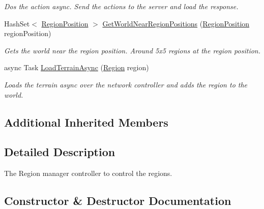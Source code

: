 \begin{DoxyCompactItemize}
\begin{DoxyCompactList}\small\item\em Dos the action async. Send the actions to the server and load the response. \end{DoxyCompactList}\item 
Hash\+Set$<$ \hyperlink{classCore_1_1Models_1_1RegionPosition}{Region\+Position} $>$ \hyperlink{classClient_1_1Common_1_1Manager_1_1RegionManagerController_a200816e068a646522d5ecb069c637698}{Get\+World\+Near\+Region\+Positions} (\hyperlink{classCore_1_1Models_1_1RegionPosition}{Region\+Position} region\+Position)
\begin{DoxyCompactList}\small\item\em Gets the world near the region position. Around 5x5 regions at the region position. \end{DoxyCompactList}\item 
async Task \hyperlink{classClient_1_1Common_1_1Manager_1_1RegionManagerController_a754eab991e880017a9e21b03ee220d25}{Load\+Terrain\+Async} (\hyperlink{classCore_1_1Models_1_1Region}{Region} region)
\begin{DoxyCompactList}\small\item\em Loads the terrain async over the network controller and adds the region to the world. \end{DoxyCompactList}\end{DoxyCompactItemize}
\subsection*{Additional Inherited Members}


\subsection{Detailed Description}
The Region manager controller to control the regions. 



\subsection{Constructor \& Destructor Documentation}
\hypertarget{classClient_1_1Common_1_1Manager_1_1RegionManagerController_a89a6a0097ec0ed4b2e26c2dcf312a27d}{}
